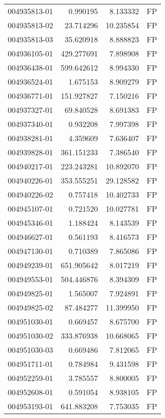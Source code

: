 \begin{tabular}{lrrl}
004935813-01 &    0.990195 &     8.133332 &   FP \\
004935813-02 &   23.714296 &    10.235854 &   FP \\
004935813-03 &   35.620918 &     8.888823 &   FP \\
004936105-01 &  429.277691 &     7.898908 &   FP \\
004936438-01 &  599.642612 &     8.994330 &   FP \\
004936524-01 &    1.675153 &     8.909279 &   FP \\
004936771-01 &  151.927827 &     7.150216 &   FP \\
004937327-01 &   69.840528 &     8.691383 &   FP \\
004937340-01 &    0.932208 &     7.997398 &   FP \\
004938281-01 &    4.359609 &     7.636407 &   FP \\
004939828-01 &  361.151233 &     7.386540 &   FP \\
004940217-01 &  223.243281 &    10.892070 &   FP \\
004940226-01 &  353.555251 &    29.128582 &   FP \\
004940226-02 &    0.757418 &    10.402733 &   FP \\
004945107-01 &    0.721520 &    10.027781 &   FP \\
004945346-01 &    1.188424 &     8.143539 &   FP \\
004946627-01 &    0.561193 &     8.416573 &   FP \\
004947130-01 &    0.710389 &     7.865086 &   FP \\
004949239-01 &  651.905642 &     8.017219 &   FP \\
004949553-01 &  504.446876 &     8.394309 &   FP \\
004949825-01 &    1.565007 &     7.924891 &   FP \\
004949825-02 &   87.484277 &    11.399950 &   FP \\
004951030-01 &    0.669457 &     8.675700 &   FP \\
004951030-02 &  333.876938 &    10.668065 &   FP \\
004951030-03 &    0.669486 &     7.812065 &   FP \\
004951711-01 &    0.784984 &     9.431598 &   FP \\
004952259-01 &    3.785557 &     8.800005 &   FP \\
004952608-01 &    0.591054 &     8.938105 &   FP \\
004953193-01 &  641.883208 &     7.753035 &   FP \\

\end{tabular}
